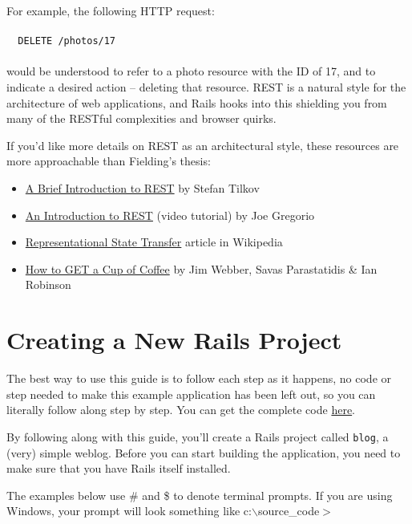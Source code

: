 \documentclass[10pt]{book}
\begin{document}
\begin{minipage}{\textwidth}
For example, the following HTTP request:
\\ \\
\verb+	DELETE /photos/17+
\\ \\
would be understood to refer to a photo resource with the ID of 17, and to indicate a desired action – deleting that resource. REST is a natural style for the architecture of web applications, and Rails hooks into this shielding you from many of the RESTful complexities and browser quirks.
\end{minipage}


If you’d like more details on REST as an architectural style, these resources are more approachable than Fielding’s thesis:
\begin{itemize}
	\item \href{http://www.infoq.com/articles/rest-introduction}{A Brief Introduction to REST} by Stefan Tilkov
	\item \href{http://bitworking.org/news/373/An-Introduction-to-REST}{An Introduction to REST} (video tutorial) by Joe Gregorio
	\item \href{http://en.wikipedia.org/wiki/Representational_State_Transfer}{Representational State Transfer} article in Wikipedia
	\item \href{http://www.infoq.com/articles/webber-rest-workflow}{How to GET a Cup of Coffee} by Jim Webber, Savas Parastatidis \& Ian Robinson
\end{itemize}

\section{ Creating a New Rails Project}

The best way to use this guide is to follow each step as it happens, no code or step needed to make this example application has been left out, so you can literally follow along step by step. You can get the complete code \href{https://github.com/lifo/docrails/tree/master/railties/guides/code/getting_started}{here}.

By following along with this guide, you’ll create a Rails project called \texttt{blog}, a (very) simple weblog. Before you can start building the application, you need to make sure that you have Rails itself installed.

The examples below use \# and \$ to denote terminal  prompts. If you are using Windows, your prompt will look something like  c:$\backslash$source\_code$>$
\end{document}
